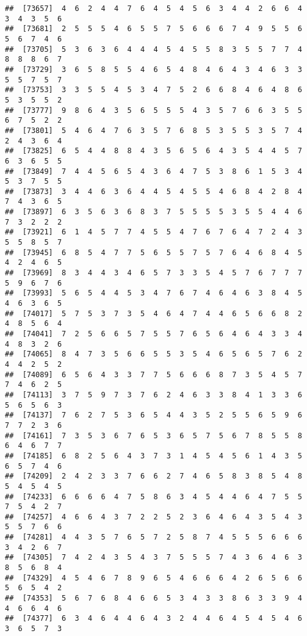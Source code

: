 \documentclass[
]{book}
\begin{document}
\begin{verbatim}
##  [73657]  4  6  2  4  4  7  6  4  5  4  5  6  3  4  4  2  6  6  4  3  4  3  5  6
##  [73681]  2  5  5  5  4  6  5  5  7  5  6  6  6  7  4  9  5  5  6  5  6  7  4  6
##  [73705]  5  3  6  3  6  4  4  4  5  4  5  5  8  3  5  5  7  7  4  8  8  8  6  7
##  [73729]  3  6  5  8  5  5  4  6  5  4  8  4  6  4  3  4  6  3  3  5  5  7  5  7
##  [73753]  3  3  5  5  4  5  3  4  7  5  2  6  6  8  4  6  4  8  6  5  3  5  5  2
##  [73777]  9  8  6  4  3  5  6  5  5  5  4  3  5  7  6  6  3  5  5  6  7  5  2  2
##  [73801]  5  4  6  4  7  6  3  5  7  6  8  5  3  5  5  3  5  7  4  2  4  3  6  4
##  [73825]  6  5  4  4  8  8  4  3  5  6  5  6  4  3  5  4  4  5  7  6  3  6  5  5
##  [73849]  7  4  4  5  6  5  4  3  6  4  7  5  3  8  6  1  5  3  4  5  3  7  5  5
##  [73873]  3  4  4  6  3  6  4  4  5  4  5  5  4  6  8  4  2  8  4  7  4  3  6  5
##  [73897]  6  3  5  6  3  6  8  3  7  5  5  5  5  3  5  5  4  4  6  7  3  2  2  2
##  [73921]  6  1  4  5  7  7  4  5  5  4  7  6  7  6  4  7  2  4  3  5  5  8  5  7
##  [73945]  6  8  5  4  7  7  5  6  5  5  7  5  7  6  4  6  8  4  5  4  2  4  6  5
##  [73969]  8  3  4  4  3  4  6  5  7  3  3  5  4  5  7  6  7  7  7  5  9  6  7  6
##  [73993]  5  6  5  4  4  5  3  4  7  6  7  4  6  4  6  3  8  4  5  4  6  3  6  5
##  [74017]  5  7  5  3  7  3  5  4  6  4  7  4  4  6  5  6  6  8  2  4  8  5  6  4
##  [74041]  7  2  5  6  6  5  7  5  5  7  6  5  6  4  6  4  3  3  4  4  8  3  2  6
##  [74065]  8  4  7  3  5  6  6  5  5  3  5  4  6  5  6  5  7  6  2  4  4  2  5  2
##  [74089]  6  5  6  4  3  3  7  7  5  6  6  6  8  7  3  5  4  5  7  7  4  6  2  5
##  [74113]  3  7  5  9  7  3  7  6  2  4  6  3  3  8  4  1  3  3  6  5  6  5  6  3
##  [74137]  7  6  2  7  5  3  6  5  4  4  3  5  2  5  5  6  5  9  6  7  7  2  3  6
##  [74161]  7  3  5  3  6  7  6  5  3  6  5  7  5  6  7  8  5  5  8  6  4  6  7  7
##  [74185]  6  8  2  5  6  4  3  7  3  1  4  5  4  5  6  1  4  3  5  6  5  7  4  6
##  [74209]  2  4  2  3  3  7  6  6  2  7  4  6  5  8  3  8  5  4  8  5  4  5  4  5
##  [74233]  6  6  6  6  4  7  5  8  6  3  4  5  4  4  6  4  7  5  5  7  5  4  2  7
##  [74257]  4  6  6  4  3  7  2  2  5  2  3  6  4  6  4  3  5  4  3  5  5  7  6  6
##  [74281]  4  4  3  5  7  6  5  7  2  5  8  7  4  5  5  5  6  6  6  3  4  2  6  7
##  [74305]  7  4  2  4  3  5  4  3  7  5  5  5  7  4  3  6  4  6  3  8  5  6  8  4
##  [74329]  4  5  4  6  7  8  9  6  5  4  6  6  6  4  2  6  5  6  6  5  6  5  4  2
##  [74353]  5  6  7  6  8  4  6  6  5  3  4  3  3  8  6  3  3  9  4  4  6  6  4  6
##  [74377]  6  3  4  6  4  4  6  4  3  2  4  4  6  4  5  4  5  4  6  3  6  5  7  3

\end{verbatim}
\end{document}
